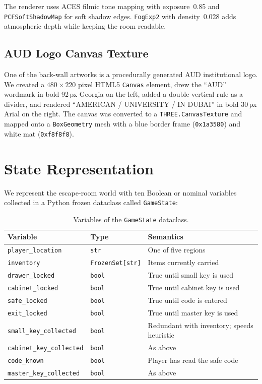 \documentclass[12pt, a4paper]{report}
\begin{document}
The renderer uses ACES filmic tone mapping with exposure~0.85 and
\texttt{PCFSoftShadowMap} for soft shadow edges.  \texttt{FogExp2} with
density~0.028 adds atmospheric depth while keeping the room readable.

\subsection{AUD Logo Canvas Texture}

One of the back-wall artworks is a procedurally generated AUD institutional
logo.  We created a $480 \times 220$ pixel HTML5 \texttt{Canvas} element, drew
the ``AUD'' wordmark in bold 92\,px Georgia on the left, added a double
vertical rule as a divider, and rendered ``AMERICAN / UNIVERSITY / IN DUBAI''
in bold 30\,px Arial on the right.  The canvas was converted to a
\texttt{THREE.CanvasTexture} and mapped onto a \texttt{BoxGeometry} mesh with
a blue border frame (\texttt{0x1a3580}) and white mat (\texttt{0xf8f8f8}).

\section{State Representation}
\label{sec:staterepresentation}

We represent the escape-room world with ten Boolean or nominal variables
collected in a Python frozen dataclass called \texttt{GameState}:

\begin{table}[H]
\centering
\caption{Variables of the \texttt{GameState} dataclass.}
\label{tab:gamestate}
\begin{tabular}{llL{5.5cm}}
\toprule
\textbf{Variable} & \textbf{Type} & \textbf{Semantics} \\
\midrule
\texttt{player\_location}        & \texttt{str}            & One of five regions \\
\texttt{inventory}               & \texttt{FrozenSet[str]} & Items currently carried \\
\texttt{drawer\_locked}          & \texttt{bool}           & True until small key is used \\
\texttt{cabinet\_locked}         & \texttt{bool}           & True until cabinet key is used \\
\texttt{safe\_locked}            & \texttt{bool}           & True until code is entered \\
\texttt{exit\_locked}            & \texttt{bool}           & True until master key is used \\
\texttt{small\_key\_collected}   & \texttt{bool}           & Redundant with inventory; speeds heuristic \\
\texttt{cabinet\_key\_collected} & \texttt{bool}           & As above \\
\texttt{code\_known}             & \texttt{bool}           & Player has read the safe code \\
\texttt{master\_key\_collected}  & \texttt{bool}           & As above \\
\bottomrule
\end{tabular}
\end{table}
\end{document}
